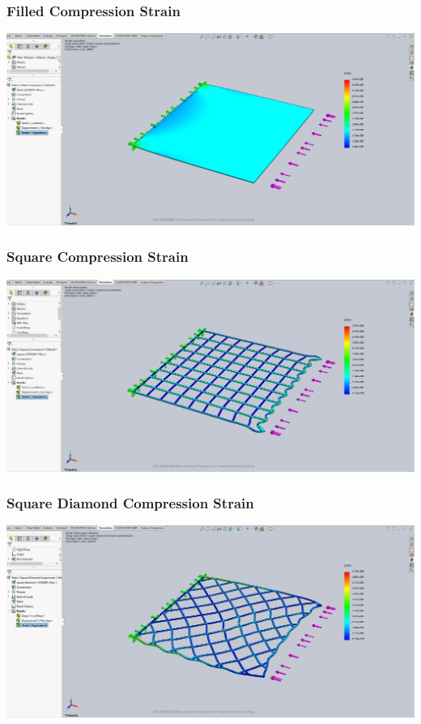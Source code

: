 \documentclass[12pt, letterpaper]{article}
\begin{document}
\begin{singlespace}
\subsubsection{Filled Compression Strain}
\label{ap:f-c-es}
\includegraphics[width=0.8\linewidth]{./graphs/compression/filled-compression-strain}

\subsubsection{Square Compression Strain}
\label{ap:s-c-es}
\includegraphics[width=0.8\linewidth]{./graphs/compression/square-compression-strain}

\subsubsection{Square Diamond Compression Strain}
\label{ap:sd-c-es}
\includegraphics[width=0.8\linewidth]{./graphs/compression/square-diamond-compression-strain}


\end{singlespace}
\end{document}
